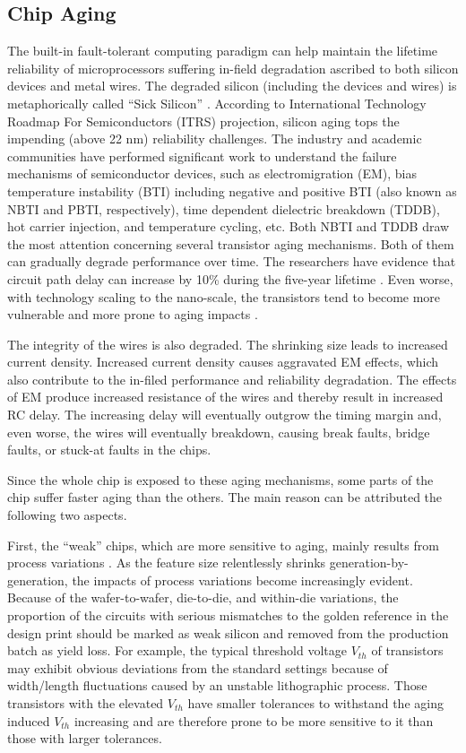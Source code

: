 \subsection{Chip Aging}
The built-in fault-tolerant computing paradigm can help maintain the lifetime reliability of microprocessors suffering in-field degradation ascribed to both silicon devices and metal wires. The degraded silicon (including the devices and wires) is metaphorically called “Sick Silicon” \cite{yan2015corerank}. According to International Technology Roadmap For Semiconductors (ITRS) projection, silicon aging tops the impending (above 22 nm) reliability challenges. The industry and academic communities have performed significant work to understand the failure mechanisms of semiconductor devices, such as electromigration (EM), bias temperature instability (BTI) including negative and positive BTI (also known as NBTI and PBTI, respectively), time dependent dielectric breakdown (TDDB), hot carrier injection, and temperature cycling, etc. Both NBTI and TDDB draw the most attention concerning several transistor aging mechanisms. Both of them can gradually degrade performance over time. The researchers have evidence that circuit path delay can increase by 10\% during the five-year lifetime \cite{wang2007impact}. Even worse, with technology scaling to the nano-scale, the transistors tend to become more vulnerable and more prone to aging impacts \cite{wang2007impact}. 

The integrity of the wires is also degraded. The shrinking size leads to increased current density. Increased current density causes aggravated EM effects, which also contribute to the in-filed performance and reliability degradation. The effects of EM produce increased resistance of the wires and thereby result in increased RC delay. The increasing delay will eventually outgrow the timing margin and, even worse, the wires will eventually breakdown, causing break faults, bridge faults, or stuck-at faults in the chips. 

Since the whole chip is exposed to these aging mechanisms, some parts of the chip suffer faster aging than the others. The main reason can be attributed the following two aspects.

First, the “weak” chips, which are more sensitive to aging, mainly results from process variations \cite{borkar2003parameter}. As the feature size relentlessly shrinks generation-by-generation, the impacts of process variations become increasingly evident. Because of the wafer-to-wafer, die-to-die, and within-die variations, the proportion of the circuits with serious mismatches to the golden reference in the design print should be marked as weak silicon and removed from the production batch as yield loss. For example, the typical threshold voltage $V_{th}$ of transistors may exhibit obvious deviations from the standard settings because of width/length fluctuations caused by an unstable lithographic process. Those transistors with the elevated $V_{th}$ have smaller tolerances to withstand the aging induced $V_{th}$ increasing and are therefore prone to be more sensitive to it than those with larger tolerances.

